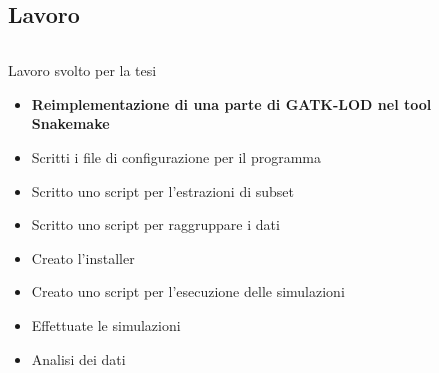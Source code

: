 \documentclass{beamer}
\begin{document}
\subsection{Lavoro}
\begin{frame}
\begin{columns}
\begin{column}{0.8\linewidth}
\begin{block}{Lavoro svolto per la tesi}
\begin{itemize}
\item \textbf{Reimplementazione di una parte di GATK-LOD nel tool Snakemake}
\item Scritti i file di configurazione per il programma
\item Scritto uno script per l'estrazioni di subset
\item Scritto uno script per raggruppare i dati
\item Creato l'installer
\item Creato uno script per l'esecuzione delle simulazioni
\item Effettuate le simulazioni 
\item Analisi dei dati
\end{itemize}
\end{block}
\end{column}
\end{columns}
\end{frame}

\end{document}
